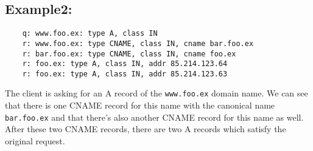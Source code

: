 \documentclass[12pt,a4paper,titlepage,final]{article}
\begin{document}
\subsection{Example2:} \label{subsec:ex2}
\begin{verbatim}
	q: www.foo.ex: type A, class IN
	r: www.foo.ex: type CNAME, class IN, cname bar.foo.ex
	r: bar.foo.ex: type CNAME, class IN, cname foo.ex
	r: foo.ex: type A, class IN, addr 85.214.123.64
	r: foo.ex: type A, class IN, addr 85.214.123.63
\end{verbatim}
The client is asking for an A record of the \texttt{www.foo.ex} domain name. We can see that there is one CNAME record for this name with the canonical name \texttt{bar.foo.ex} and that there's also another CNAME record for this name as well. After these two CNAME records, there are two A records which satisfy the original request.
\newpage


\begin{flushleft}
	
\end{flushleft}
\end{document}
